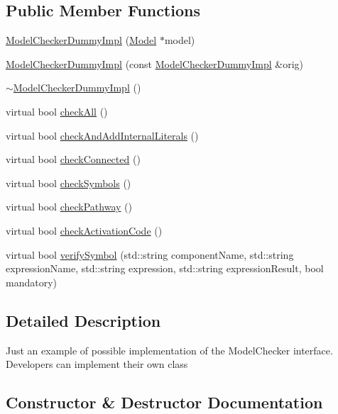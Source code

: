 \subsection*{Public Member Functions}
\begin{DoxyCompactItemize}
\item 
\hyperlink{class_model_checker_dummy_impl_ac5bf7d1781e02c40fa5f5ffb492a6a41}{Model\+Checker\+Dummy\+Impl} (\hyperlink{class_model}{Model} $\ast$model)
\item 
\hyperlink{class_model_checker_dummy_impl_a12f9a63a5614327ca40a9bd690b5d609}{Model\+Checker\+Dummy\+Impl} (const \hyperlink{class_model_checker_dummy_impl}{Model\+Checker\+Dummy\+Impl} \&orig)
\item 
\hyperlink{class_model_checker_dummy_impl_a67466924e4c6b112576193215e5dc908}{$\sim$\+Model\+Checker\+Dummy\+Impl} ()
\item 
virtual bool \hyperlink{class_model_checker_dummy_impl_a2e7cd50b851b68f18270316f7ac19360}{check\+All} ()
\item 
virtual bool \hyperlink{class_model_checker_dummy_impl_a1e4c7d6c7adbc85c34e66be662199cae}{check\+And\+Add\+Internal\+Literals} ()
\item 
virtual bool \hyperlink{class_model_checker_dummy_impl_a04c496601085ec1736b5937cb4360bfb}{check\+Connected} ()
\item 
virtual bool \hyperlink{class_model_checker_dummy_impl_a773a4924a7603f6b931a53e58190cda0}{check\+Symbols} ()
\item 
virtual bool \hyperlink{class_model_checker_dummy_impl_a83fa84deee3cbc3e8888236c50d729c9}{check\+Pathway} ()
\item 
virtual bool \hyperlink{class_model_checker_dummy_impl_a0ad95531ae6a9d2693914f5825e0f6d5}{check\+Activation\+Code} ()
\item 
virtual bool \hyperlink{class_model_checker_dummy_impl_af02c0747aa03a726f506be15aaa4ff10}{verify\+Symbol} (std\+::string component\+Name, std\+::string expression\+Name, std\+::string expression, std\+::string expression\+Result, bool mandatory)
\end{DoxyCompactItemize}


\subsection{Detailed Description}
Just an example of possible implementation of the Model\+Checker interface. Developers can implement their own class 

\subsection{Constructor \& Destructor Documentation}
